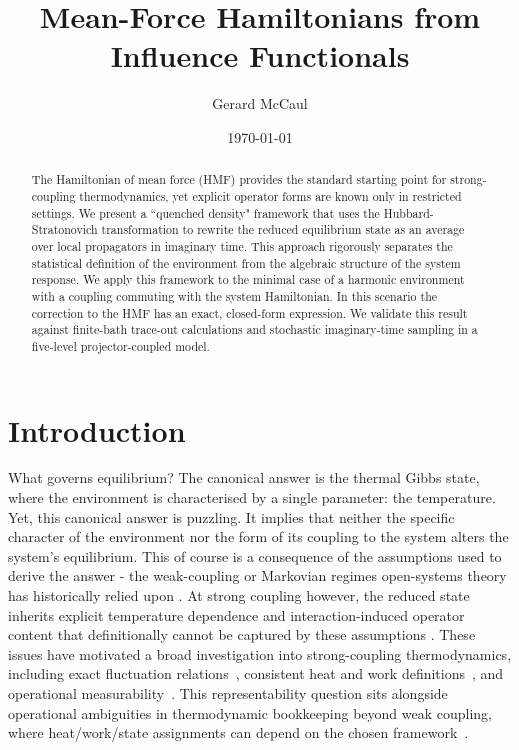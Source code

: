 \documentclass[aps,prl,twocolumn,superscriptaddress,showpacs,floatfix]{revtex4-2}
\begin{document}
\title{Mean-Force Hamiltonians from Influence Functionals}
\author{Gerard McCaul}
\date{\today}

\begin{abstract}
The Hamiltonian of mean force (HMF) provides the standard starting point for strong-coupling thermodynamics, yet explicit operator forms are known only in restricted settings. We present a ``quenched density" framework that uses the Hubbard-Stratonovich transformation to rewrite the reduced equilibrium state as an average over local propagators in imaginary time. This approach rigorously separates the statistical definition of the environment from the algebraic structure of the system response. We apply this framework to the minimal case of a harmonic environment with a coupling commuting with the system Hamiltonian. In this scenario the correction to the HMF has an exact, closed-form expression. We validate this result against finite-bath trace-out calculations and stochastic imaginary-time sampling in a five-level projector-coupled model.
\end{abstract}

\maketitle

\section{\label{sec:intro}Introduction}

What governs equilibrium? The canonical answer is the thermal Gibbs state, where the environment is characterised by a single parameter: the temperature. Yet, this canonical answer is puzzling. It implies that neither the specific character of the environment nor the form of its coupling to the system alters the system's equilibrium. This of course is a consequence of the assumptions used to derive the answer - the weak-coupling or Markovian regimes open-systems theory has historically relied upon \cite{breuerTheoryOpenQuantum2002}. At strong coupling however, the reduced state inherits explicit temperature dependence and interaction-induced operator content that definitionally cannot be captured by these assumptions \cite{hanggiFiniteQuantumDissipation2008,ingoldSpecificHeatAnomalies2009}. These issues have motivated a broad investigation into strong-coupling thermodynamics, including exact fluctuation relations~\cite{campisiFluctuationTheoremArbitrary2009,jarzynskiNonequilibriumWorkTheorem2004,gooldNonequilibriumThermodynamics2019}, consistent heat and work definitions~\cite{espositoNatureHeatStrongly2015,rivasStrongCouplingThermodynamics2020,lacerdaQuantumThermodynamicsFast2023}, and operational measurability~\cite{strasbergMeasurabilityNonequilibriumThermodynamics2020,millerEntropyProduction2017,binderOperationalThermodynamics2019}. This representability question sits alongside operational ambiguities in thermodynamic bookkeeping beyond weak coupling, where heat/work/state assignments can depend on the chosen framework~\cite{BinderVinjanampathyModiGoold2015}. 
\end{document}
